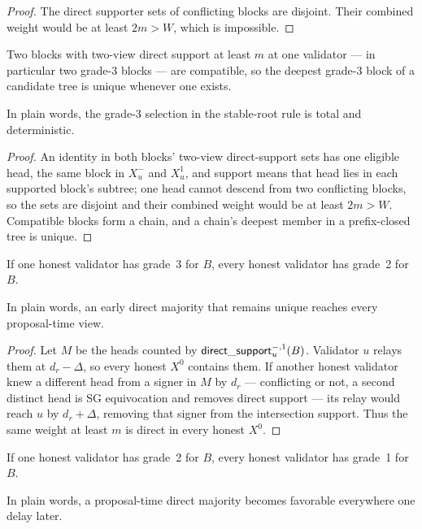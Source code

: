 \begin{proof}
The direct supporter sets of conflicting blocks are disjoint.  Their
combined weight would be at least \(2m>W\), which is impossible.
\end{proof}

\begin{corollary}
\label{cor:g3-chain}
Two blocks with two-view direct support at least \(m\) at one validator
--- in particular two grade-3 blocks --- are compatible, so the deepest
grade-3 block of a candidate tree is unique whenever one exists.

In plain words, the grade-3 selection in the stable-root rule is total
and deterministic.
\end{corollary}

\begin{proof}
An identity in both blocks' two-view direct-support sets has one
eligible head, the same block in \(X_u^-\) and \(X_u^1\), and support
means that head lies in each supported block's subtree; one head cannot
descend from two conflicting blocks, so the sets are disjoint and their
combined weight would be at least \(2m>W\).  Compatible blocks form a
chain, and a chain's deepest member in a prefix-closed tree is unique.
\end{proof}

\begin{lemma}\label{lem:g3-g2}
If one honest validator has grade~3 for \(B\), every honest validator has
grade~2 for \(B\).

In plain words, an early direct majority that remains unique reaches every
proposal-time view.
\end{lemma}

\begin{proof}
Let \(M\) be the heads counted by
\(\mathsf{direct\_support}_u^{-,1}(B)\).  Validator \(u\) relays them at
\(d_r-\Delta\), so every honest \(X^0\) contains them.  If another honest
validator knew a different head from a signer in \(M\) by \(d_r\) ---
conflicting or not, a second distinct head is SG equivocation and removes
direct support --- its
relay would reach \(u\) by \(d_r+\Delta\), removing that signer from the
intersection support.  Thus the same weight at least \(m\) is direct in
every honest \(X^0\).
\end{proof}

\begin{lemma}\label{lem:g2-g1}
If one honest validator has grade~2 for \(B\), every honest validator has
grade~1 for \(B\).

In plain words, a proposal-time direct majority becomes favorable everywhere
one delay later.
\end{lemma}

